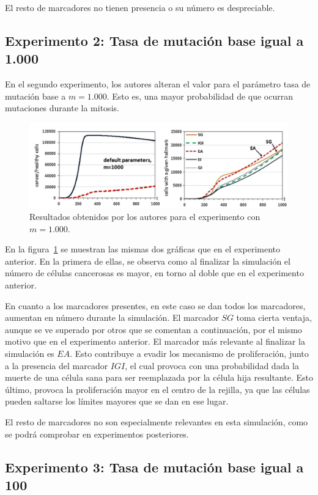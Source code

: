 El resto de marcadores no tienen presencia o su número es despreciable.

\subsection{Experimento 2: Tasa de mutación base igual a 1.000}

En el segundo experimento, los autores alteran el valor para el parámetro tasa de
mutación base a $m=1.000$. Esto es, una mayor probabilidad de que ocurran mutaciones
durante la mitosis.

\begin{figure}[h]
\centering
\includegraphics[scale=0.6]{figures/experiments/exp2}
\caption{Resultados obtenidos por los autores para el experimento con $m=1.000$.}
\label{fig:exp2}
\end{figure}

En la figura~\ref{fig:exp2} se muestran las mismas dos gráficas que en el experimento anterior.
En la primera de ellas, se observa como al finalizar la simulación el número de células
cancerosas es mayor, en torno al doble que en el experimento anterior.

En cuanto a los marcadores presentes, en este caso se dan todos los marcadores, aumentan en
número durante la simulación. El marcador $SG$ toma cierta ventaja, aunque se ve superado por
otros que se comentan a continuación, por el mismo motivo que en el experimento anterior. El
marcador más relevante al finalizar la simulación es $EA$. Esto contribuye a evadir
los mecanismo de proliferación, junto a la presencia del marcador $IGI$, el cual
provoca con una probabilidad dada la muerte de una célula sana para ser reemplazada por
la célula hija resultante. Esto último, provoca la proliferación mayor en el centro
de la rejilla, ya que las células pueden saltarse los límites mayores que se dan en ese lugar.

El resto de marcadores no son especialmente relevantes en esta simulación, como se podrá comprobar
en experimentos posteriores.

\subsection{Experimento 3: Tasa de mutación base igual a 100}

